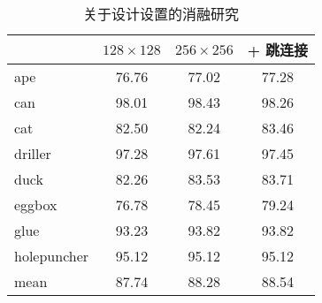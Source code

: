 \begin{table}
    \centering
     \caption{关于设计设置的消融研究}
    \begin{tabular}{lccc}
    \toprule 
    & $128\times128$ & $256\times256$ & + 跳连接 \\
    \midrule
    ape & 76.76 & 77.02 & 77.28 \\
    can & 98.01 & 98.43 & 98.26 \\
    cat & 82.50 & 82.24 & 83.46 \\
    driller & 97.28 & 97.61 & 97.45 \\
    duck & 82.26 & 83.53 & 83.71 \\
    eggbox & 76.78 & 78.45 & 79.24 \\
    glue & 93.23 & 93.82 & 93.82 \\
    holepuncher & 95.12 & 95.12 & 95.12 \\
    \midrule
    mean & 87.74 & 88.28 & 88.54 \\
    \bottomrule
  \end{tabular}
  \label{tab:main_ablation}
\end{table}
